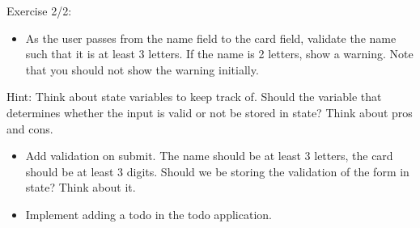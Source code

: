 \documentclass[presentation]{beamer}
\begin{document}
\begin{frame}[label={sec:orgheadline16}]{Exercise 2/2:}
\begin{itemize}
\item As the user passes from the name field to the card field, validate the name
such that it is at least 3 letters. If the name is 2 letters, show a
warning. Note that you should not show the warning initially.
\end{itemize}

Hint: Think about state variables to keep track of. Should the variable that
determines whether the input is valid or not be stored in state? Think about
pros and cons.

\begin{itemize}
\item Add validation on submit. The name should be at least 3 letters, the card
should be at least 3 digits. Should we be storing the validation of the form
in state? Think about it.

\item Implement adding a todo in the todo application.
\end{itemize}
\end{frame}
\end{document}

